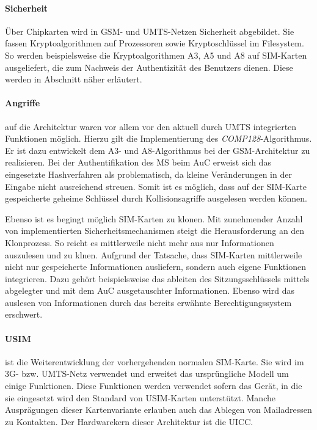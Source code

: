 \paragraph{Sicherheit}
Über Chipkarten wird in \ac{GSM}- und \ac{UMTS}-Netzen Sicherheit abgebildet.
Sie fassen Kryptoalgorithmen auf Prozessoren sowie Kryptoschlüssel im
Filesystem. So werden beispielsweise die Kryptoalgorithmen A3, A5 und A8
auf SIM-Karten ausgeliefert, die zum Nachweis der Authentizität des Benutzers dienen.
Diese werden in Abschnitt 
näher erläutert.

\paragraph{Angriffe} auf die Architektur waren vor allem vor den aktuell durch UMTS
integrierten Funktionen möglich. Hierzu gilt die Implementierung des \textit{COMP128}-Algorithmus.
Er ist dazu entwickelt dem A3- und A8-Algorithmus bei der GSM-Architektur zu realisieren.
Bei der Authentifikation des \ac{MS} beim \ac{AuC} erweist sich das eingesetzte Hashverfahren
als problematisch, da kleine Veränderungen in der Eingabe nicht ausreichend streuen. Somit
ist es möglich, dass auf der SIM-Karte gespeicherte geheime Schlüssel durch Kollisionsagriffe
ausgelesen werden können.

Ebenso ist es begingt möglich SIM-Karten zu klonen. Mit zunehmender Anzahl von implementierten
Sicherheitsmechanismen steigt die Herausforderung an den Klonprozess. So reicht es mittlerweile
nicht mehr aus nur Informationen auszulesen und zu klnen.
Aufgrund der Tatsache, dass SIM-Karten mittlerweile nicht nur gespeicherte Informationen
ausliefern, sondern auch eigene Funktionen integrieren.
Dazu gehört beispielsweise das ableiten des Sitzungsschlüssels
mittels abgelegter und mit dem \ac{AuC} ausgetauschter Informationen. Ebenso wird das auslesen
von Informationen durch das bereits erwähnte Berechtigungssystem erschwert.

\paragraph{\ac{USIM}} ist die Weiterentwicklung der vorhergehenden normalen \ac{SIM}-Karte. Sie wird
im 3G- bzw. UMTS-Netz verwendet und erweitet das ursprüngliche Modell um einige Funktionen.
Diese Funktionen werden verwendet sofern das Gerät, in die sie eingesetzt wird den Standard
von USIM-Karten unterstützt. Manche Ausprägungen dieser Kartenvariante erlauben auch das Ablegen
von Mailadressen zu Kontakten. Der Hardwarekern dieser Architektur ist die \ac{UICC}.


